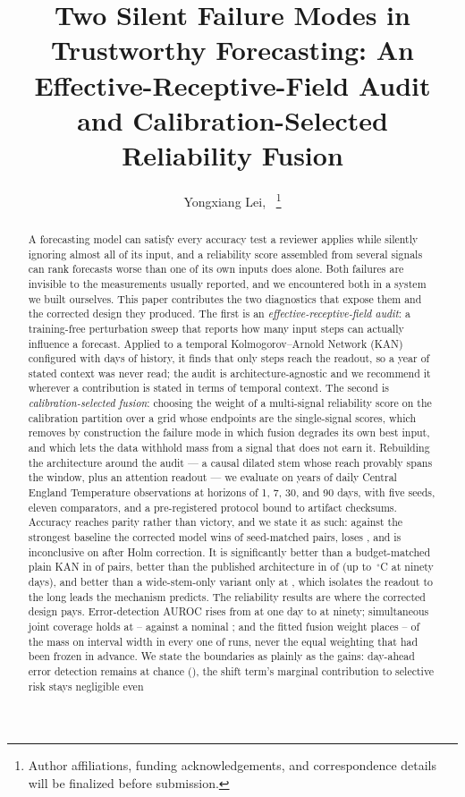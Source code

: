 \documentclass[journal]{IEEEtran}
\title{Two Silent Failure Modes in Trustworthy Forecasting: An Effective-Receptive-Field Audit and Calibration-Selected Reliability Fusion}
\author{Yongxiang Lei,~\IEEEmembership{Member,~IEEE}%
\thanks{Author affiliations, funding acknowledgements, and correspondence details will be finalized before submission.}}
\newcommand{\degC}{\ensuremath{^{\circ}}C}
\begin{document}
\maketitle

\begin{abstract}
A forecasting model can satisfy every accuracy test a reviewer applies while silently ignoring almost all of its input, and a reliability score assembled from several signals can rank forecasts worse than one of its own inputs does alone. Both failures are invisible to the measurements usually reported, and we encountered both in a system we built ourselves. This paper contributes the two diagnostics that expose them and the corrected design they produced. The first is an \emph{effective-receptive-field audit}: a training-free perturbation sweep that reports how many input steps can actually influence a forecast. Applied to a temporal Kolmogorov--Arnold Network (KAN) configured with \robustHistory{} days of history, it finds that only \robustFieldPublished{} steps reach the readout, so a year of stated context was never read; the audit is architecture-agnostic and we recommend it wherever a contribution is stated in terms of temporal context. The second is \emph{calibration-selected fusion}: choosing the weight of a multi-signal reliability score on the calibration partition over a grid whose endpoints are the single-signal scores, which removes by construction the failure mode in which fusion degrades its own best input, and which lets the data withhold mass from a signal that does not earn it. Rebuilding the architecture around the audit --- a causal dilated stem whose reach provably spans the window, plus an attention readout --- we evaluate on \cetSpanYears{} years of daily Central England Temperature observations at horizons of 1, 7, 30, and 90 days, with five seeds, eleven comparators, and a pre-registered protocol bound to artifact checksums. Accuracy reaches parity rather than victory, and we state it as such: against the strongest baseline the corrected model wins \pairedTransformerWins{} of \pairedTransformerTotal{} seed-matched pairs, loses \pairedTransformerLosses{}, and is inconclusive on \pairedTransformerTied{} after Holm correction. It is significantly better than a budget-matched plain KAN in \pairedKanWins{} of \pairedKanTotal{} pairs, better than the published architecture in \pairedPublishedWins{} of \pairedPublishedTotal{} (up to \pairedPublishedNinety{}\,\degC{} at ninety days), and better than a wide-stem-only variant only at \pairedDilatedWinHorizons{}, which isolates the readout to the long leads the mechanism predicts. The reliability results are where the corrected design pays. Error-detection AUROC rises from \errorAurocOne{} at one day to \errorAurocNinety{} at ninety; simultaneous joint coverage holds at \simulCoverageThirty{}--\simulCoverageNinety{} against a nominal \nominalCoverage{}; and the fitted fusion weight places \fusionWeightLow{}--\fusionWeightHigh{} of the mass on interval width in every one of \fusionRuns{} runs, never the equal weighting that had been frozen in advance. We state the boundaries as plainly as the gains: day-ahead error detection remains at chance (\errorAurocOne{}), the shift term's marginal contribution to selective risk stays negligible even 
\end{abstract}
\end{document}
